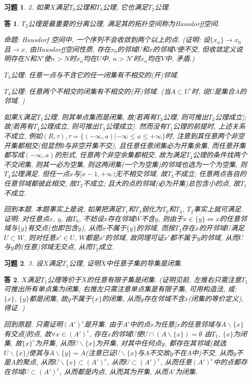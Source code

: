 \documentclass{ctexart}%
\newtheorem*{exercise}{习题}
\newtheorem*{solution}{答}
\theoremstyle{definition}
\theoremstyle{remark}
\begin{document}
\begin{exercise}2. 如果$X$满足$T_0$公理和$T_3$公理, 它也满足$T_2$公理. 
\end{exercise}
\begin{solution}
$T_2$公理是最重要的分离公理, 满足其的拓扑空间称为Hausdorff空间. 

命题: Hausdorf 空间中, 一个序列不会收敛到两个以上的点. (证明: 设$\{x_n\}\rightarrow x_0$ 且$\rightarrow x$, 由Hausdorff空间性质, 存在$x_0$的邻域$U$和$x$的邻域$V$使不交, 但收敛定义说明存在$N$和$N'$使$n>N$时$x_n$均在$U$中, $n>N'$时$x_n$均在$V$中, 矛盾.) 

$T_3$公理: 任意一点与不含它的任一闭集有不相交的(开)邻域. 

$T_4$公理: 任意两个不相交的闭集有不相交的(开)邻域. (当$A\subset U^\circ$时, 说$U$是集合$A$的邻域. )

如果$X$满足$T_1$公理, 则其单点集而是闭集, 故[若再有$T_3$公理, 则可推出$T_2$公理成立]; 故[若再有$T_4$公理成立, 则可推出$T_3$公理成立]. 然而没有$T_1$公理的前提时, 上述关系不成立, 例如$(R,\tau), \tau=\{(-\infty,a)|-\infty\leq a\leq +\infty\}$时, 注意到其任意两个非空开集都相交(但显然$\emptyset$与非空开集不交), 且任意任意闭集必为开集余集, 而任意开集都写成$(-\infty, a)$的形式, 任意两个非空余集都相交, 故为满足$T_4$公理的条件找两个不交闭集, 则其一必为空集, 则这两闭集(一个为空集)的邻域也选为一个为空集, 则$T_4$公理满足. 但任一点$x$与$[x-1,+\infty)$无不相交邻域, 故$T_3$不成立; 任意两点各自的任意邻域都彼此相交, 故$T_2$不成立; 且大的点的邻域(必为开集)总包含小的点, 故$T_1$不成立. 

回到本题. 本题事实上是说, 如果把满足$T_1$和$T_3$弱化为$T_0$和$T_3$, $T_2$事实上就可满足. 证明: 对任意点$x$, $y$, 由$T_0$, 不妨设$x$存在邻域$W$不含$y$, 则由于$x\in \overline{\{y\}}\Longleftrightarrow x$的任意邻域与$\{y\}$有交点(也即包含$y$), 从而$x$不属于$\{y\}$的邻域, 而按$T_3$存在$x$的开邻域$U$满足$\overline{U}\subset W$, 则对任意$x'\in {U}$, $W$都是$x'$的邻域, 故同理可证$x'$都不属于$y$的邻域, 从而$U$与$y$的(任意)邻域无交点, 从而$T_2$成立. 
\end{solution}

\begin{exercise}3. 设$X$满足$T_1$公理, 证明$X$中任意子集的导集是闭集.
\end{exercise}
\begin{solution}$X$满足$T_1$公理等价于$X$的任意有限子集是闭集. (证明见前, 左推右只需注意$T_1$可推出所有单点集为闭集; 右推左只需注意单点集是有限子集, 可用构造法, 或: $\{x\}$, $\{y\}$都是闭集, 故$y$不属于$\{x\}$的闭集, 从而$y$存在邻域不含$x$(闭集的等价定义), 得证. )

回到原题. 只需证明$(A')^c$是开集. 由于$A'$中的点$x$为任意[$x$的任意邻域与$A\backslash\{x\}$有交点]的点, 故$\forall x\in (A')^c$, 存在$x$的邻域$U$使$U\cap (A\backslash\{x\})= \emptyset$ 由$T_1$, $\{x\}$为闭集, 故$\{x\}^c$为开集, 从而$U\backslash \{x\}$为开集, 对其中任何点$y$, 都存在其邻域(就选$U\backslash \{x\}$)使其与$A\backslash\{y\}=A$(注意已证$U\backslash \{x\}$与$A$不交故$y$不在$A$中)不交, 从而$y$不是$A$的聚点, 从而$U\backslash \{x\}\subset (A')^c$, 从而$U\subset (A')^c$, 从而任意$(A')^c$中的点都存在邻域$U\subset (A')^c$, 从而都是内点, 从而其为开集, 从而$A'$为闭集. 
\end{solution}
\end{document}
